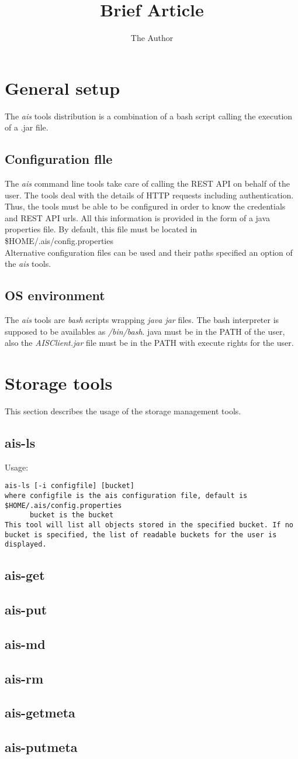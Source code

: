 \documentclass[11pt]{article}
\title{Brief Article}
\author{The Author}
\begin{document}
\maketitle
\section{General setup}
The \emph{ais} tools distribution is a combination of a bash script calling the execution of a .jar file.
\subsection{Configuration flle}
The \emph{ais} command line tools take care of calling the REST API on behalf of the user. The tools deal with the details of HTTP requests including authentication. Thus, the tools must be able to be configured in order to know the credentials and REST API urls. All this information is provided in the form of a java properties file. By default, this file must be located in \$HOME/.ais/config.properties\\
Alternative configuration files can be used and their paths specified an option of the \emph{ais} tools.
\subsection{OS environment}
The \emph{ais} tools are \emph{bash} scripts wrapping \emph{java jar} files. The bash interpreter is supposed to be availables as \emph{/bin/bash}. java must be in the PATH of the user, also the \emph{AISClient.jar} file must be in the PATH with execute rights for the user.
\section{Storage tools}
This section describes the usage of the storage management tools.
\subsection{ais-ls}
Usage:\\
\begin{verbatim}
ais-ls [-i configfile] [bucket]
where configfile is the ais configuration file, default is $HOME/.ais/config.properties
      bucket is the bucket
This tool will list all objects stored in the specified bucket. If no bucket is specified, the list of readable buckets for the user is displayed.
\end{verbatim}
\subsection{ais-get}
\subsection{ais-put}
\subsection{ais-md}
\subsection{ais-rm}
\subsection{ais-getmeta}
\subsection{ais-putmeta}
\end{document}
